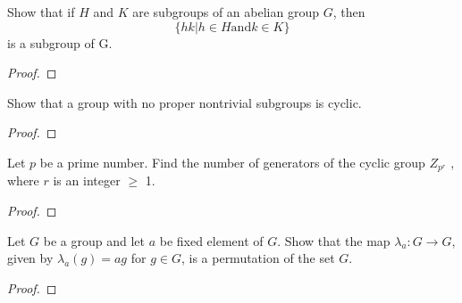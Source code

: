 \begin{theorem}[Exercise 4]\label{Ex4}
  \leanok
    Show that if $H$ and $K$ are subgroups of an abelian group $G$, then
    $$
    \{hk|h \in H \text{and} k \in K\}
    $$
    is a subgroup of G.
\end{theorem}
\begin{proof}
  \leanok
\end{proof}

\begin{theorem}[Exercise 5]\label{Ex5}
  \leanok
Show that a group with no proper nontrivial subgroups is cyclic.

\end{theorem}
\begin{proof}
  \leanok
\end{proof}

\begin{theorem}[Exercise 6]\label{Ex6}
  \leanok
    Let $p$ be a prime number. Find the number of generators of the cyclic group $Z_{p^r}$ , where $r$ is an integer $\ge$ 1.
\end{theorem}
\begin{proof}
  \leanok
\end{proof}

\begin{theorem}[Exercise 13]\label{Ex13}
  \leanok
    Let $G$ be a group and let $a$ be fixed element of $G$. Show that the map $\lambda_a: G\to G$, given by $\lambda_a(g)=ag$ for $g\in G$, is a permutation of the set $G$.
\end{theorem}
\begin{proof}
  \leanok
\end{proof}